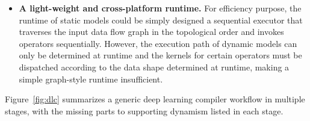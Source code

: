 \begin{itemize}

\item \textbf{A light-weight and cross-platform runtime.} For efficiency purpose, the runtime of static models could be simply designed a sequential executor that traverses the input data flow graph in the topological order and invokes operators sequentially. However, the execution path of dynamic models can only be determined at runtime and the kernels for certain operators must be dispatched according to the data shape determined at runtime, making a simple graph-style runtime insufficient.
\end{itemize}

Figure~\ref{fig:dlc} summarizes a generic deep learning compiler workflow in multiple stages, with the missing parts to supporting dynamism listed in each stage.  %
